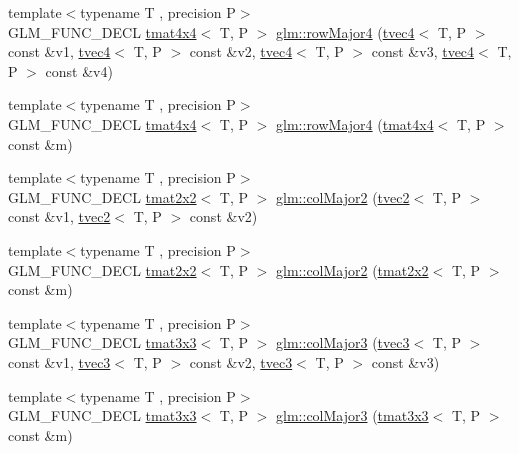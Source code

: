 \begin{DoxyCompactItemize}
\item 
{\footnotesize template$<$typename T , precision P$>$ }\\G\+L\+M\+\_\+\+F\+U\+N\+C\+\_\+\+D\+E\+CL \hyperlink{structglm_1_1tmat4x4}{tmat4x4}$<$ T, P $>$ \hyperlink{group__gtx__matrix__major__storage_ga3ce8f2a78fb2f15bf28151ee128b0ae8}{glm\+::row\+Major4} (\hyperlink{structglm_1_1tvec4}{tvec4}$<$ T, P $>$ const \&v1, \hyperlink{structglm_1_1tvec4}{tvec4}$<$ T, P $>$ const \&v2, \hyperlink{structglm_1_1tvec4}{tvec4}$<$ T, P $>$ const \&v3, \hyperlink{structglm_1_1tvec4}{tvec4}$<$ T, P $>$ const \&v4)
\item 
{\footnotesize template$<$typename T , precision P$>$ }\\G\+L\+M\+\_\+\+F\+U\+N\+C\+\_\+\+D\+E\+CL \hyperlink{structglm_1_1tmat4x4}{tmat4x4}$<$ T, P $>$ \hyperlink{group__gtx__matrix__major__storage_ga85771a88c114a088a0414bcfce55e729}{glm\+::row\+Major4} (\hyperlink{structglm_1_1tmat4x4}{tmat4x4}$<$ T, P $>$ const \&m)
\item 
{\footnotesize template$<$typename T , precision P$>$ }\\G\+L\+M\+\_\+\+F\+U\+N\+C\+\_\+\+D\+E\+CL \hyperlink{structglm_1_1tmat2x2}{tmat2x2}$<$ T, P $>$ \hyperlink{group__gtx__matrix__major__storage_ga599fff4f1c65912b256a82138ebcca37}{glm\+::col\+Major2} (\hyperlink{structglm_1_1tvec2}{tvec2}$<$ T, P $>$ const \&v1, \hyperlink{structglm_1_1tvec2}{tvec2}$<$ T, P $>$ const \&v2)
\item 
{\footnotesize template$<$typename T , precision P$>$ }\\G\+L\+M\+\_\+\+F\+U\+N\+C\+\_\+\+D\+E\+CL \hyperlink{structglm_1_1tmat2x2}{tmat2x2}$<$ T, P $>$ \hyperlink{group__gtx__matrix__major__storage_ga5cfd25de9d5b4c6a825085f38ddfeff7}{glm\+::col\+Major2} (\hyperlink{structglm_1_1tmat2x2}{tmat2x2}$<$ T, P $>$ const \&m)
\item 
{\footnotesize template$<$typename T , precision P$>$ }\\G\+L\+M\+\_\+\+F\+U\+N\+C\+\_\+\+D\+E\+CL \hyperlink{structglm_1_1tmat3x3}{tmat3x3}$<$ T, P $>$ \hyperlink{group__gtx__matrix__major__storage_ga3a55e2948193e91733e434e7cc3c1540}{glm\+::col\+Major3} (\hyperlink{structglm_1_1tvec3}{tvec3}$<$ T, P $>$ const \&v1, \hyperlink{structglm_1_1tvec3}{tvec3}$<$ T, P $>$ const \&v2, \hyperlink{structglm_1_1tvec3}{tvec3}$<$ T, P $>$ const \&v3)
\item 
{\footnotesize template$<$typename T , precision P$>$ }\\G\+L\+M\+\_\+\+F\+U\+N\+C\+\_\+\+D\+E\+CL \hyperlink{structglm_1_1tmat3x3}{tmat3x3}$<$ T, P $>$ \hyperlink{group__gtx__matrix__major__storage_gaa93f3dcc47ced18e5db4a853363d9386}{glm\+::col\+Major3} (\hyperlink{structglm_1_1tmat3x3}{tmat3x3}$<$ T, P $>$ const \&m)

\end{DoxyCompactItemize}
